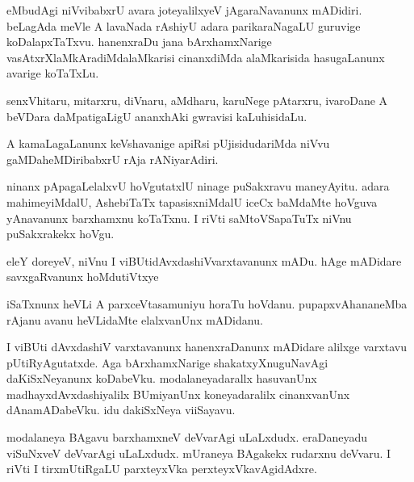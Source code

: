 \documentclass{article}
\begin{document}
\begin{mn}
eMbudAgi  niVvibabxrU  avara  joteyalilxyeV  jAgaraNavanunx  mADidiri.  beLagAda  
meVle  A  lavaNada  rAshiyU  adara  parikaraNagaLU  guruvige  koDalapxTaTxvu.  
hanenxraDu  jana  bArxhamxNarige  vasAtxrXlaMkAradiMdalaMkarisi  cinanxdiMda  
alaMkarisida  hasugaLanunx  avarige  koTaTxLu.
\end{mn}

\begin{mn}
senxVhitaru,  mitarxru,  diVnaru,  aMdharu,  karuNege  pAtarxru,  ivaroDane  A  
beVDara  daMpatigaLigU  ananxhAki  gwravisi  kaLuhisidaLu.
\end{mn}

\begin{mn}
A  kamaLagaLanunx  keVshavanige  apiRsi  pUjisidudariMda  niVvu  gaMDaheMDiribabxrU  rAja rANiyarAdiri.
\end{mn}

\begin{mn}
ninanx  pApagaLelalxvU  hoVgutatxlU  ninage  puSakxravu  maneyAyitu.  adara  
mahimeyiMdalU,  AshebiTaTx  tapasisxniMdalU  iceCx baMdaMte  hoVguva  yAnavanunx  
barxhamxnu  koTaTxnu.  I riVti  saMtoVSapaTuTx  niVnu  puSakxrakekx  hoVgu.
\end{mn}

\begin{mn}
eleY  doreyeV,  niVnu  I  viBUtidAvxdashiVvarxtavanunx  mADu.  hAge  mADidare  savxgaRvanunx  hoMdutiVtxye
\end{mn}

\begin{mn}
iSaTxnunx  heVLi  A  parxceVtasamuniyu  horaTu hoVdanu.  pupapxvAhananeMba  
rAjanu  avanu  heVLidaMte  elalxvanUnx  mADidanu.
\end{mn}

\begin{mn}
I viBUti dAvxdashiV varxtavanunx  hanenxraDanunx  mADidare  alilxge  varxtavu  
pUtiRyAgutatxde.  Aga  bArxhamxNarige  shakatxyXnuguNavAgi  daKiSxNeyanunx  
koDabeVku.  modalaneyadarallx  hasuvanUnx  madhayxdAvxdashiyalilx  BUmiyanUnx  
koneyadaralilx  cinanxvanUnx  dAnamADabeVku.  idu  dakiSxNeya  viiSayavu. 
\end{mn}

\begin{mn}
modalaneya  BAgavu  barxhamxneV  deVvarAgi  uLaLxdudx.  eraDaneyadu  viSuNxveV  
deVvarAgi  uLaLxdudx.  mUraneya  BAgakekx  rudarxnu  deVvaru.  I riVti  I  
tirxmUtiRgaLU  parxteyxVka perxteyxVkavAgidAdxre.
\end{mn}
\end{document}
